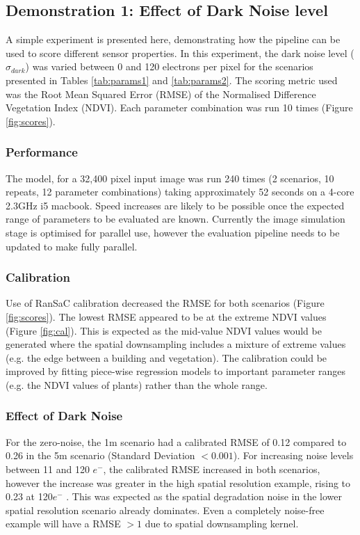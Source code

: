 \documentclass[10pt,a4paper,final,twocolumn]{article}
\begin{document}
\subsection{Demonstration 1: Effect of Dark Noise level}
\begin{figure*}
\centering
\caption{Uncalibrated (red) and calibrated (black) Root Mean Squared Error for low spatial resolution (solid) and high spatial resolution (dashed) scenarios over a range of dark noise levels}
\label{fig:scores}
\end{figure*}

A simple experiment is presented here, demonstrating how the pipeline can be used to score different sensor properties. In this experiment, the dark noise level ($\sigma_{dark}$) was varied between 0 and 120 electrons per pixel for the scenarios presented in Tables \ref{tab:params1} and \ref{tab:params2}. The scoring metric used was the Root Mean Squared Error (RMSE) of the Normalised Difference Vegetation Index (NDVI).  Each parameter combination was run 10 times (Figure \ref{fig:scores}).

\subsubsection{Performance}
The model, for a 32,400 pixel input image was run 240 times (2 scenarios, 10 repeats, 12 parameter combinations) taking approximately 52 seconds on a 4-core 2.3GHz i5 macbook. Speed increases are likely to be possible once the expected range of parameters to be evaluated are known. Currently the image simulation stage is optimised for parallel use, however the evaluation pipeline needs to be updated to make fully parallel.

\subsubsection{Calibration}
Use of RanSaC calibration decreased the RMSE for both scenarios (Figure \ref{fig:scores}). The lowest RMSE appeared to be at the extreme NDVI values (Figure \ref{fig:cal}). This is expected as the mid-value NDVI values would be generated where the spatial downsampling includes a mixture of extreme values (e.g. the edge between a building and vegetation). The calibration could be improved by fitting piece-wise regression models to important parameter ranges (e.g. the NDVI values of plants) rather than the whole range.

\subsubsection{Effect of Dark Noise}
For the zero-noise, the 1m scenario had a calibrated RMSE of 0.12 compared to 0.26 in the 5m scenario (Standard Deviation $<0.001$). For increasing noise levels between 11 and 120 $e^-$, the calibrated RMSE increased in both scenarios, however the increase was greater in the high spatial resolution example, rising to 0.23 at 120$e^-$ . This was expected as the spatial degradation noise in the lower spatial resolution scenario already dominates. Even a completely noise-free example will have a RMSE $>1$ due to spatial downsampling kernel.
\end{document}
